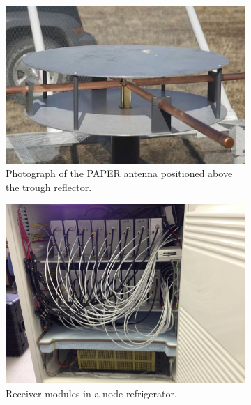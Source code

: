 \documentclass[preprint]{aastex}
\begin{document}
\begin{figure}[h]
	\centering
	\begin{subfigure}[b]{0.3\textwidth}
		\includegraphics[width=\textwidth]{plots/new_antenna_closeup.jpg}
		\caption{Photograph of the PAPER antenna positioned above the trough reflector.}
		\label{fig:element}
	\end{subfigure}
	\quad
	\begin{subfigure}[b]{0.3\textwidth}
		\includegraphics[width=\textwidth]{plots/Engineering/recv_node.png}
		\caption{Receiver modules in a node refrigerator.}
		\label{fig:recv_node} 
	\end{subfigure}
	\quad
	\begin{subfigure}[b]{0.3\textwidth}

\end{subfigure}
\end{figure}
\end{document}
